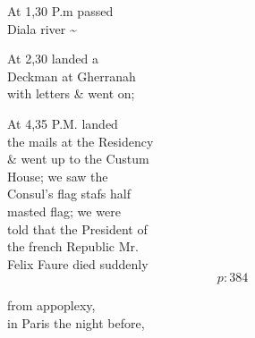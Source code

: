\documentclass{report}
\begin{document}
	\par{
 	At 1,30 P.m passed\ \\Diala river \~{}\ \\
	}

	\par{
 	At 2,30 landed a\ \\Deckman at Gherranah\ \\with letters \& went on;\ \\
	}

	\par{
 	At 4,35 P.M. landed\ \\the mails at the Residency\ \\\& went up to the Custum\ \\House; we saw the\ \\Consul's flag stafs half\ \\masted flag; we were\ \\told that the President of\ \\the french Republic Mr.\ \\Felix Faure died suddenly\ \\
  \[p: 384 \]

	}

	\par{
 	from appoplexy,\ \\in Paris the night before,\ \\
	}
\end{document}
